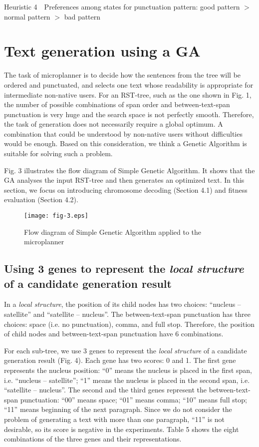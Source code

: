 \documentclass[english]{jnlp_1.2.0}
\begin{document}
\textsf{Heuristic 4}~~Preferences among states for punctuation pattern: good pattern $>$ normal pattern $>$ bad pattern 


\section{Text generation using a GA}

The task of microplanner is to decide how the sentences from 
the tree will be ordered and punctuated, and selects one text 
whose readability is appropriate for intermediate non-native 
users. For an RST-tree, such as the one shown in Fig. 1, 
the number of possible combinations of span order and between-text-span 
punctuation is very huge and the search space is not perfectly 
smooth. Therefore, the task of generation does not necessarily require a 
global optimum. A combination that could be understood by 
non-native users without difficulties would be enough. Based 
on this consideration, we think a Genetic Algorithm is suitable 
for solving such a problem. 

Fig. 3 illustrates the flow diagram of Simple Genetic Algorithm.
It shows that the GA analyses the input RST-tree and then
generates an optimized text. In this section, we focus on
introducing chromosome decoding (Section 4.1) and fitness evaluation 
(Section 4.2).

\begin{figure}[b]
\begin{center}
\texttt{[image: fig-3.eps]}
\end{center}
\caption{Flow diagram of Simple Genetic Algorithm applied to the microplanner}
\end{figure}


\subsection{Using 3 genes to represent the \textit{local structure} of 
a candidate generation result}

In a \textit{local structure}, the position of its child nodes
has two choices: ``nucleus -- satellite'' and 
``satellite -- nucleus''. The between-text-span 
punctuation has three choices: space (i.e. no punctuation), 
comma, and full stop. Therefore, the position of child nodes and
between-text-span punctuation have 6 combinations.

For each sub-tree, we use 3 genes to represent the \textit{local structure} 
of a candidate generation result (Fig. 4). Each gene has 
two scores: 0 and 1. The first gene represents the nucleus position: 
``0'' means the nucleus is placed in the first span, i.e. 
``nucleus -- satellite''; ``1'' means the nucleus is placed
in the second span, i.e. ``satellite -- nucleus''. The 
second and the third genes represent the 
between-text-span punctuation: ``00'' means space; ``01'' means comma; 
``10'' means full stop; ``11'' means beginning of the next paragraph. 
Since we do not consider the problem of generating a text with more 
than one paragraph, ``11'' is not desirable, so its score is negative 
in the experiments. Table 5 shows the eight combinations of the three 
genes and their representations. 
\end{document}

